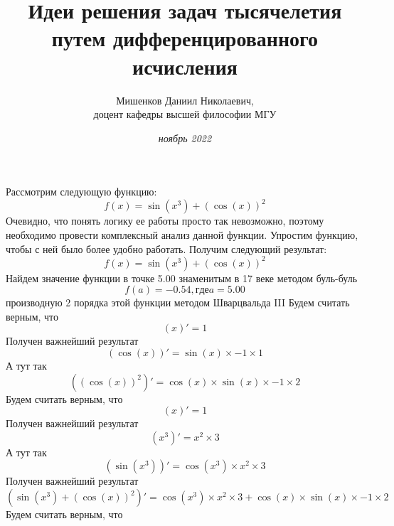 \documentclass{article}
\title{\textbf {Идеи решения задач тысячелетия путем дифференцированного исчисления}}
\author{Мишенков Даниил Николаевич,\\
		доцент кафедры высшей философии МГУ}
\date{\textit {\normalsize {ноябрь 2022}}}
\begin{document}
\maketitle
\section {}
Рассмотрим следующую функцию:\newline
\[f(x) = \sin( x ^{ 3 })+(\cos( x ))^{ 2 }\]\newline
Очевидно, что понять логику ее работы просто так невозможно, поэтому необходимо провести комплексный анализ данной функции.\newline\newline
Упростим функцию, чтобы с ней было более удобно работать.\newline
Получим следующий результат:\newline\newline
\[f(x) = \sin( x ^{ 3 })+(\cos( x ))^{ 2 }\]\newline
Найдем значение функции в точке 5.00 знаменитым в 17 веке методом буль-буль\newline\[f(a) = -0.54, где a = 5.00\] производную 2 порядка этой функции методом Шварцвальда III\newline
Будем считать верным, что\newline
\[( x )' =  1 \]\newline
Получен важнейший результат\newline
\[(\cos( x ))' = \sin( x )\times -1 \times 1 \]\newline
А тут так\newline
\[((\cos( x ))^{ 2 })' = \cos( x )\times\sin( x )\times -1 \times 2 \]\newline
Будем считать верным, что\newline
\[( x )' =  1 \]\newline
Получен важнейший результат\newline
\[( x ^{ 3 })' =  x ^{ 2 }\times 3 \]\newline
А тут так\newline
\[(\sin( x ^{ 3 }))' = \cos( x ^{ 3 })\times x ^{ 2 }\times 3 \]\newline
Получен важнейший результат\newline
\[(\sin( x ^{ 3 })+(\cos( x ))^{ 2 })' = \cos( x ^{ 3 })\times x ^{ 2 }\times 3 +\cos( x )\times\sin( x )\times -1 \times 2 \]\newline
Будем считать верным, что\newline
\end{document}
